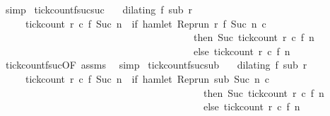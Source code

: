 \begin{isabellebody}
\ simp%
\endisatagproof
{\isafoldproof}%
%
\isadelimproof
\isanewline
%
\endisadelimproof
\isanewline
{}\isamarkupfalse%
\ tick{\isacharunderscore}count{\isacharunderscore}f{\isacharunderscore}suc{\isacharunderscore}suc{\isacharcolon}\isanewline
\ \ \ {\isacartoucheopen}dilating\ f\ sub\ r{\isacartoucheclose}\isanewline
\ \ \ \ \ {\isacartoucheopen}tick{\isacharunderscore}count\ r\ c\ {\isacharparenleft}f\ {\isacharparenleft}Suc\ n{\isacharparenright}{\isacharparenright}\ {\isacharequal}\ {\isacharparenleft}if\ hamlet\ {\isacharparenleft}{\isacharparenleft}Rep{\isacharunderscore}run\ r{\isacharparenright}\ {\isacharparenleft}f\ {\isacharparenleft}Suc\ n{\isacharparenright}{\isacharparenright}\ c{\isacharparenright}\isanewline
\ \ \ \ \ \ \ \ \ \ \ \ \ \ \ \ \ \ \ \ \ \ \ \ \ \ \ \ \ \ \ \ \ \ \ \ \ \ \ then\ Suc\ {\isacharparenleft}tick{\isacharunderscore}count\ r\ c\ {\isacharparenleft}f\ n{\isacharparenright}{\isacharparenright}\isanewline
\ \ \ \ \ \ \ \ \ \ \ \ \ \ \ \ \ \ \ \ \ \ \ \ \ \ \ \ \ \ \ \ \ \ \ \ \ \ \ else\ tick{\isacharunderscore}count\ r\ c\ {\isacharparenleft}f\ n{\isacharparenright}{\isacharparenright}{\isacartoucheclose}\isanewline
%
\isadelimproof
%
\endisadelimproof
%
\isatagproof
{}\isamarkupfalse%
\ tick{\isacharunderscore}count{\isacharunderscore}f{\isacharunderscore}suc{\isacharbrackleft}OF\ assms{\isacharbrackright}\ \isamarkupfalse%
\ simp%
\endisatagproof
{\isafoldproof}%
%
\isadelimproof
\isanewline
%
\endisadelimproof
\isanewline
{}\isamarkupfalse%
\ tick{\isacharunderscore}count{\isacharunderscore}f{\isacharunderscore}suc{\isacharunderscore}sub{\isacharcolon}\isanewline
\ \ \ {\isacartoucheopen}dilating\ f\ sub\ r{\isacartoucheclose}\isanewline
\ \ \ \ \ {\isacartoucheopen}tick{\isacharunderscore}count\ r\ c\ {\isacharparenleft}f\ {\isacharparenleft}Suc\ n{\isacharparenright}{\isacharparenright}\ {\isacharequal}\ {\isacharparenleft}if\ hamlet\ {\isacharparenleft}{\isacharparenleft}Rep{\isacharunderscore}run\ sub{\isacharparenright}\ {\isacharparenleft}Suc\ n{\isacharparenright}\ c{\isacharparenright}\isanewline
\ \ \ \ \ \ \ \ \ \ \ \ \ \ \ \ \ \ \ \ \ \ \ \ \ \ \ \ \ \ \ \ \ \ \ \ \ \ \ \ \ then\ Suc\ {\isacharparenleft}tick{\isacharunderscore}count\ r\ c\ {\isacharparenleft}f\ n{\isacharparenright}{\isacharparenright}\isanewline
\ \ \ \ \ \ \ \ \ \ \ \ \ \ \ \ \ \ \ \ \ \ \ \ \ \ \ \ \ \ \ \ \ \ \ \ \ \ \ \ \ else\ tick{\isacharunderscore}count\ r\ c\ {\isacharparenleft}f\ n{\isacharparenright}{\isacharparenright}{\isacartoucheclose}\isanewline

\end{isabellebody}
